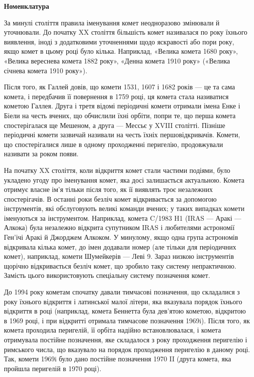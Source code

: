 \documentclass[a4paper]{article}
\begin{document}
    \textbf{Номенклатура}
    
    За минулі століття правила іменування комет неодноразово змінювали й уточнювали. До початку XX століття більшість комет називалася по року їхнього виявлення, іноді з додатковими уточненнями щодо яскравості або пори року, якщо комет в цьому році було кілька. Наприклад, «Велика комета 1680 року», «Велика вереснева комета 1882 року», «Денна комета 1910 року» («Велика січнева комета 1910 року»).
    
    Після того, як Галлей довів, що комети 1531, 1607 і 1682 років --- це та сама комета, і передбачив її повернення в 1759 році, ця комета стала називатися кометою Галлея. Друга і третя відомі періодичні комети отримали імена Енке і Біели на честь вчених, що обчислили їхні орбіти, попри те, що перша комета спостерігалася ще Мешеном, а друга --- Мессьє у XVIII столітті. Пізніше періодичні комети зазвичай називали на честь їхніх першовідкривачів. Комети, що спостерігалися лише в одному проходженні перигелію, продовжували називати за роком появи.

    На початку XX століття, коли відкриття комет стали частими подіями, було укладено угоду про іменування комет, яка досі залишається актуальною. Комета отримує власне ім'я тільки після того, як її виявлять троє незалежних спостерігачів. В останні роки безліч комет відкривається за допомогою інструментів, які обслуговують великі команди вчених; у таких випадках комети іменуються за інструментом. Наприклад, комета C/1983 H1 (IRAS --- Аракі --- Алкока) була незалежно відкрита супутником IRAS і любителями астрономії Ген'ічі Аракі й Джорджем Алкоком. У минулому, якщо одна група астрономів відкривала кілька комет, до імен додавали номер (але тільки для періодичних комет), наприклад, комети Шумейкерів --- Леві 9. Зараз низкою інструментів щорічно відкривається безліч комет, що зробило таку систему непрактичною. Замість цього використовують спеціальну систему позначення комет.
    
    До 1994 року кометам спочатку давали тимчасові позначення, що складалися з року їхнього відкриття і латинської малої літери, яка вказувала порядок їхнього відкриття в році (наприклад, комета Беннетта була дев'ятою кометою, відкритою в 1969 році, і при відкритті отримала тимчасове позначення 1969i). Після того, як комета проходила перигелій, її орбіта надійно встановлювалася, і комета отримувала постійне позначення, яке складалося з року проходження перигелію і римського числа, що вказувало на порядок проходження перигелію в даному році. Так, комети 1969i було дано постійне позначення 1970 II (друга комета, яка пройшла перигелій в 1970 році).
    
\end{document}
